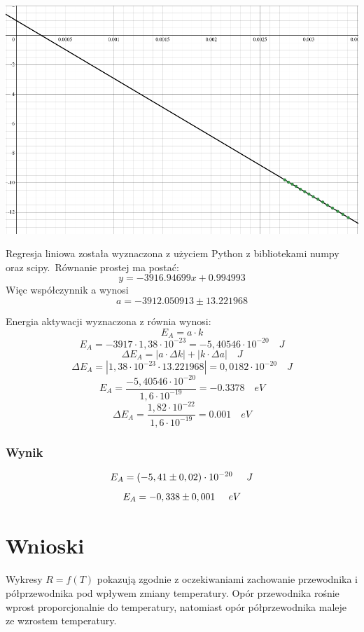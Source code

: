 \documentclass[a4paper, 11pt]{article}
\begin{document}
\begin{center}
	\includegraphics[scale=0.4]{images/reg_pol.png}

\end{center}


Regresja liniowa została wyznaczona z użyciem Python z bibliotekami numpy oraz scipy.\
Równanie prostej ma postać:
\[
	y = -3916.94699x + 0.994993
\]
Więc współczynnik a wynosi
\[
	a = -3912.050913 \pm 13.221968
\]

Energia aktywacji wyznaczona z równia wynosi:
\[
	E_A = a \cdot k
\]
\[
	E_A = -3917 \cdot 1,38 \cdot 10^{-23} = -5,40546 \cdot 10^{-20} \quad J
\]
\[
	\Delta E_A = |a \cdot \Delta k| + |k \cdot \Delta a| \quad J
\]
\[
	\Delta E_A = | 1,38 \cdot 10^{-23} \cdot 13.221968|  = 0,0182 \cdot 10^{-20} \quad J
\]
\[
	E_A =\frac{-5,40546 \cdot 10^{-20}}{1,6 \cdot 10^{-19}} = -0.3378 \quad eV
\]
\[
	\Delta E_A = \frac{1,82 \cdot 10^{-22}}{1,6 \cdot 10^{-19}} = 0.001 \quad eV
\]

\subsubsection{Wynik}\label{sub:wynik} %
\[
	\Large E_A = ( -5,41 \pm 0,02) \cdot 10^{-20} \quad J
\]
\[
	\Large E_A =  -0,338 \pm 0,001  \quad eV
\]


\section{Wnioski}\label{sec:wnioski} %

Wykresy $R = f(T)$ pokazują zgodnie z oczekiwaniami zachowanie przewodnika i półprzewodnika pod wpływem zmiany temperatury.
Opór przewodnika rośnie wprost proporcjonalnie do temperatury, natomiast opór półprzewodnika maleje ze wzrostem temperatury.
\end{document}
